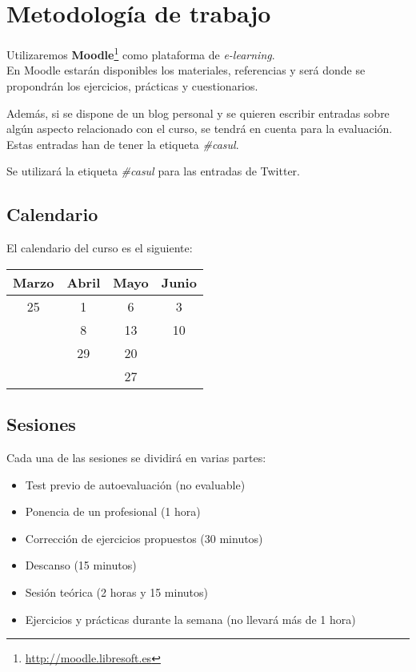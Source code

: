 \documentclass[a4paper]{article}
\begin{document}
  \section{Metodología de trabajo}
  Utilizaremos \textbf{Moodle}\footnote{\url{http://moodle.libresoft.es}} como plataforma de \textit{e-learning}.\\
  En Moodle estarán disponibles los materiales, referencias y será donde se propondrán los ejercicios, prácticas y cuestionarios.

  Además, si se dispone de un blog personal y se quieren escribir entradas sobre algún aspecto relacionado con el curso, se tendrá en cuenta para la evaluación. Estas entradas han de tener la etiqueta \textit{\#casul}.

  Se utilizará la etiqueta \textit{\#casul} para las entradas de Twitter.
    
    \subsection{Calendario}
    El calendario del curso es el siguiente: 

    \medskip

    \begin{tabular}{| c | c | c | c |}
      \hline
      Marzo & Abril & Mayo & Junio \\
      \hline
      25 & 1 & 6 & 3 \\
      & 8 & 13 & 10 \\
      & 29 & 20 & \\
      & & 27 & \\
      \hline
    \end{tabular}

    \subsection{Sesiones}
      Cada una de las sesiones se dividirá en varias partes:
      \begin{itemize}
        \item Test previo de autoevaluación (no evaluable)
        \item Ponencia de un profesional (1 hora)
        \item Corrección de ejercicios propuestos (30 minutos)
        \item Descanso (15 minutos)
        \item Sesión teórica (2 horas y 15 minutos)
        \item Ejercicios y prácticas durante la semana (no llevará más de 1 hora)
      \end{itemize}
\end{document}
